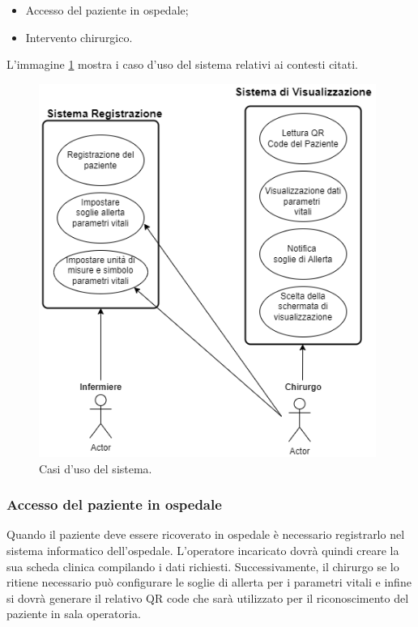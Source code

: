 \begin{itemize}
    \item Accesso del paziente in ospedale;
    \item Intervento chirurgico.
\end{itemize}

L'immagine \ref{pic:use-cases} mostra i caso d'uso del sistema relativi ai contesti citati.

\begin{figure}[ht]
    \includegraphics[width=11cm]{Images/useCase.png}
    \centering
    \caption{\label{pic:use-cases}Casi d'uso del sistema.}
\end{figure}

\subsubsection{Accesso del paziente in ospedale}
Quando il paziente deve essere ricoverato in ospedale è necessario registrarlo nel sistema informatico dell'ospedale. L'operatore incaricato dovrà quindi creare la sua scheda clinica compilando i dati richiesti. Successivamente, il chirurgo se lo ritiene necessario può configurare le soglie di allerta per i parametri vitali e infine si dovrà generare il relativo QR code che sarà utilizzato per il riconoscimento del paziente in sala operatoria.

